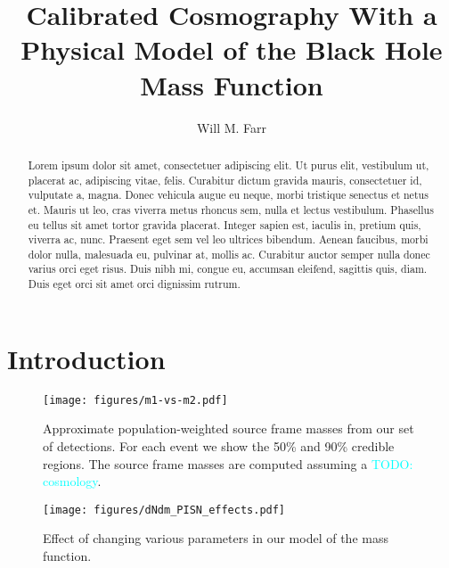 \documentclass[modern]{aastex631}
\newcommand{\todo}[1]{\textcolor{cyan}{TODO: #1}}
\begin{document}
\title{Calibrated Cosmography With a Physical Model of the Black Hole Mass Function}

\author[0000-0003-1540-8562]{Will M. Farr}

\begin{abstract}
    Lorem ipsum dolor sit amet, consectetuer adipiscing elit. Ut purus elit,
    vestibulum ut, placerat ac, adipiscing vitae, felis. Curabitur dictum
    gravida mauris, consectetuer id, vulputate a, magna. Donec vehicula augue eu
    neque, morbi tristique senectus et netus et. Mauris ut leo, cras viverra
    metus rhoncus sem, nulla et lectus vestibulum. Phasellus eu tellus sit amet
    tortor gravida placerat. Integer sapien est, iaculis in, pretium quis,
    viverra ac, nunc. Praesent eget sem vel leo ultrices bibendum. Aenean
    faucibus, morbi dolor nulla, malesuada eu, pulvinar at, mollis ac. Curabitur
    auctor semper nulla donec varius orci eget risus. Duis nibh mi, congue eu,
    accumsan eleifend, sagittis quis, diam. Duis eget orci sit amet orci
    dignissim rutrum.
\end{abstract}

\section{Introduction}
\label{sec:intro}

\begin{figure}
    \begin{center}
        \texttt{[image: figures/m1-vs-m2.pdf]}
    \end{center}
    \caption{Approximate population-weighted source frame masses from our set of detections.  For each event we show the 50\% and 90\% credible regions.  The source frame masses are computed assuming a \todo{cosmology}.}
    \label{fig:m1-vs-m2}
\end{figure}

\begin{figure}
    \begin{center}
        \texttt{[image: figures/dNdm\_PISN\_effects.pdf]}
    \end{center}
    \caption{Effect of changing various parameters in our model of the mass function.}
    \label{fig:dNdm_PISN_effects}
\end{figure}
\end{document}
